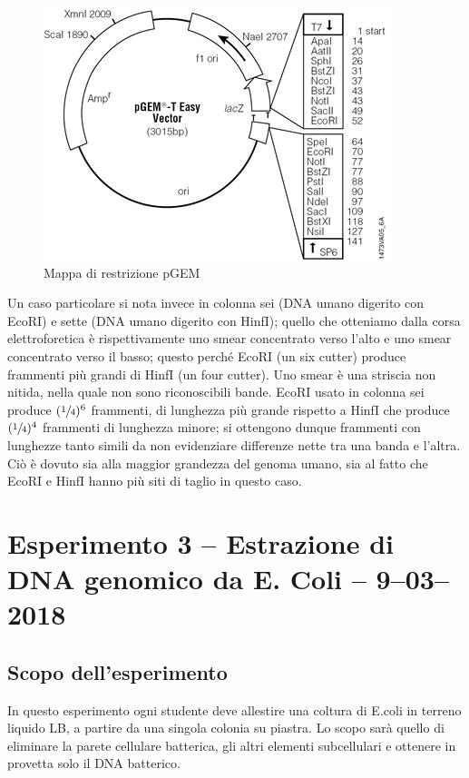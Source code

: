 \documentclass[twocolumn,a4paper,10pt]{my_report}
\begin{document}
\begin{figure}[htbp]
\centering
\includegraphics[width=0.8\linewidth]{2.jpg}
\caption{Mappa di restrizione pGEM}
\label{fig:pGEM}
\end{figure}

Un caso particolare si nota invece in colonna sei (DNA umano digerito con EcoRI) e sette (DNA umano digerito con HinfI); quello che otteniamo dalla corsa elettroforetica è rispettivamente uno smear concentrato verso l’alto e uno smear concentrato verso il basso; questo perché EcoRI (un six cutter) produce frammenti più grandi di HinfI (un four cutter).
Uno smear è una striscia non nitida, nella quale non sono riconoscibili bande.
EcoRI usato in colonna sei produce $(\sfrac{1}{4})^6$ frammenti, di lunghezza più grande rispetto a HinfI che produce $(\sfrac{1}{4})^4$ frammenti di lunghezza minore; si ottengono dunque frammenti con lunghezze tanto simili da non evidenziare differenze nette tra una banda e l’altra.
Ciò è dovuto sia alla maggior grandezza del genoma umano, sia al fatto che EcoRI e HinfI hanno più siti di taglio in questo caso.

\section{Esperimento 3 -- Estrazione di DNA genomico da E. Coli -- 9--03--2018}

\subsection{Scopo dell’esperimento}
In questo esperimento ogni studente deve allestire una coltura di E.coli in terreno liquido LB, a partire da una singola colonia su piastra. Lo scopo sarà quello di eliminare la parete cellulare batterica, gli altri elementi subcellulari e ottenere in provetta solo il DNA batterico.
\end{document}
